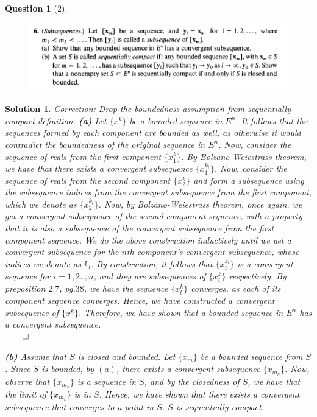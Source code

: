 \documentclass{article} %
\theoremstyle{quest}
\newtheorem*{question}{Question}
\newtheorem*{solution}{Solution}
\begin{document}
\begin{question}[2]
\hfill
\begin{figure}[h!]
  \centering
    \includegraphics[width=1\textwidth]{MA-2-24-6.png}
\end{figure}
\end{question}
\begin{solution}
Correction: Drop the boundedness assumption from sequentially compact definition.
\textbf{(a)}
Let $\{ x^k \}$ be a bounded sequence in $E^n$. It follows that the sequences formed
by each component are bounded as well, as otherwise it would contradict the boundedness
of the original sequence in $E^n$. Now, consider the sequence of reals 
from the first component $\{x^k_{1}\}$. By Bolzano-Weiestrass theorem, we have that
there exists a convergent subsequence $\{x^{k_i}_{1}\}$. Now, consider the sequence of
reals from the second component $\{x^k_{2}\}$ and form a subsequence using the
subsequence indices from the convergent subsequence from the first component, which 
we denote as $\{ x^{k_i}_{2}\}$. Now, by Bolzano-Weiestrass theorem, once again,
we get a convergent subsequence of the second component sequence, with a property
that it is also a subsequence of the convergent subsequence from the first component sequence.
We do the above construction inductively until we get a convergent subsequence for the
$n$th component's convergent subsequence, whose indices we denote as $k_l$.
By construction, it follows that $\{x^{k_l}_i\}$ is a convergent sequence for $i = 1,2..,n$,
and they are subsequences of $\{x^k_i\}$ respectively. By preposition $2.7$, pg.$38$, we have
the sequence $\{ x^k_l\}$ converges, as each of its component sequence converges. Hence, we have
constructed a convergent subsequence of $\{x^k\}$. Therefore, we have shown that 
a bounded sequence in $E^n$ has a convergent subsequence. \\ 
\hfill $\qed$
 
\bigskip

\textbf{(b)} Assume that $S$ is closed and bounded.
Let $\{ x_m \}$ be a bounded sequence from $S$. Since $S$ is bounded, by $(a)$, there exists
a convergent subsequence $\{x_{m_k} \}$. Now, observe that $\{ x_{m_k}\}$ is a sequence in $S$,
and by the closedness of $S$, we have that the limit of $\{x_{m_k}\}$ is in $S$. Hence, we have
shown that there exists a convergent subsequence that converges to a point in $S$. $S$ is sequentially
compact. 


\end{solution}
\end{document}
